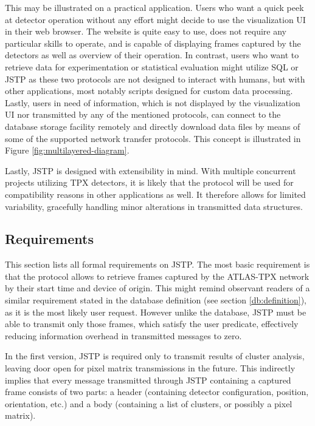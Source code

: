 This may be illustrated on a practical application. Users who want a quick peek at detector operation without any effort might decide to use the visualization UI in their web browser. The website is quite easy to use, does not require any particular skills to operate, and is capable of displaying frames captured by the detectors as well as overview of their operation. In contrast, users who want to retrieve data for experimentation or statistical evaluation might utilize SQL or JSTP as these two protocols are not designed to interact with humans, but with other applications, most notably scripts designed for custom data processing. Lastly, users in need of information, which is not displayed by the visualization UI nor transmitted by any of the mentioned protocols, can connect to the database storage facility remotely and directly download data files by means of some of the supported network transfer protocols. This concept is illustrated in Figure \ref{fig:multilayered-diagram}.

Lastly, JSTP is designed with extensibility in mind. With multiple concurrent projects utilizing TPX detectors, it is likely that the protocol will be used for compatibility reasons in other applications as well. It therefore allows for limited variability, gracefully handling minor alterations in transmitted data structures.

\subsection{Requirements}
This section lists all formal requirements on JSTP. The most basic requirement is that the protocol allows to retrieve frames captured by the ATLAS-TPX network by their start time and device of origin. This might remind observant readers of a similar requirement stated in the database definition (see section \ref{db:definition}), as it is the most likely user request. However unlike the database, JSTP must be able to transmit only those frames, which satisfy the user predicate, effectively reducing information overhead in transmitted messages to zero.

In the first version, JSTP is required only to transmit results of cluster analysis, leaving door open for pixel matrix transmissions in the future. This indirectly implies that every message transmitted through JSTP containing a captured frame consists of two parts: a header (containing detector configuration, position, orientation, etc.) and a body (containing a list of clusters, or possibly a pixel matrix).


